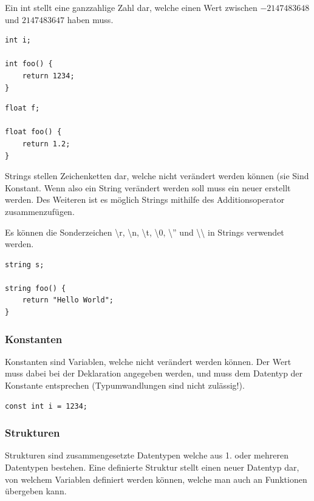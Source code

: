 
Ein int stellt eine ganzzahlige Zahl dar, welche einen Wert zwischen $-2147483648$ und $2147483647$ haben muss.

\begin{lstlisting}[language=CMM]
int i;

int foo() {
	return 1234;
}
\end{lstlisting}


\begin{lstlisting}[language=CMM]
float f;

float foo() {
	return 1.2;
}
\end{lstlisting}


Strings stellen Zeichenketten dar, welche nicht verändert werden können (sie Sind Konstant. Wenn also ein String verändert werden soll muss ein neuer erstellt werden. Des Weiteren ist es möglich Strings mithilfe des Additionsoperator zusammenzufügen.

Es k\"onnen die Sonderzeichen \textbackslash{}r, \textbackslash{}n, \textbackslash{}t, \textbackslash{}0, \textbackslash{}'' und \textbackslash{}\textbackslash{} in Strings verwendet werden.

\begin{lstlisting}[language=CMM]
string s;

string foo() {
	return "Hello World";
}
\end{lstlisting}

\subsubsection{Konstanten}

Konstanten sind Variablen, welche nicht ver\"andert werden k\"onnen. Der Wert muss dabei bei der Deklaration angegeben werden, und muss dem Datentyp der Konstante entsprechen (Typumwandlungen sind nicht zul\"assig!).

\begin{lstlisting}[language=CMM]
const int i = 1234;
\end{lstlisting}

\subsubsection{Strukturen}

Strukturen sind zusammengesetzte Datentypen welche aus 1. oder mehreren Datentypen bestehen. Eine definierte Struktur stellt einen neuer Datentyp dar, von welchem Variablen definiert werden k\"onnen, welche man auch an Funktionen \"ubergeben kann.

